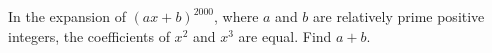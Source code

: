 In the expansion of $(ax+b)^{2000}$, where $a$ and $b$ are relatively prime positive integers, the coefficients of $x^{2}$ and $x^{3}$ are equal. Find $a+b$.
